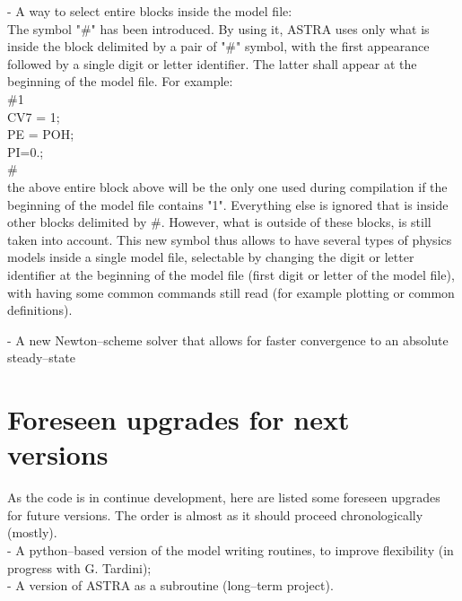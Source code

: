 - A way to select entire blocks inside the model file:\\
The symbol "\#" has been introduced. By using it, ASTRA uses only what is inside the block delimited by a pair of "\#" symbol, with the first appearance followed by a single digit or letter identifier. The latter shall appear at the beginning of the model file. For example:\\
\#1 \\
CV7 = 1;\\
PE = POH;\\
PI=0.;\\
\# \\
the above entire block above will be the only one used during compilation if the beginning of the model file contains "1". Everything else is ignored that is inside other blocks delimited by $\#$. However, what is outside of these blocks, is still taken into account.
This new symbol thus allows to have several types of physics models inside a single model file, selectable by changing the digit or letter identifier at the beginning of the model file (first digit or letter of the model file), with having some common commands still read (for example plotting or common definitions).

- A new Newton--scheme solver that allows for faster convergence to an absolute steady--state
%

\clearpage

\section{Foreseen upgrades for next versions}
As the code is in continue development, here are listed some foreseen upgrades for future versions. The order is almost as it should proceed chronologically (mostly).\\
- A python--based version of the model writing routines, to improve flexibility (in progress with G. Tardini);\\
- A version of ASTRA as a subroutine (long--term project).\\
%

\clearpage
